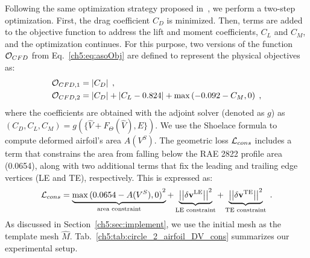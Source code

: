 Following the same optimization strategy proposed in~\citet{aa.Li2021}, we perform a two-step optimization. First, the drag coefficient $C_D$ is minimized. Then, terms are added to the objective function to address the lift and moment coefficients, $C_L$ and $C_M$, and the optimization continues. For this purpose, two versions of the function $ \mathcal{O}_{CFD}$ from Eq.~\ref{ch5:eq:asoObj} are defined to represent the physical objectives as:
%
\begin{align}
    &\mathcal{O}_{CFD,1} = \left| C_D \right|\;, \\
    &\mathcal{O}_{CFD,2} = \left| C_D \right| + \left| C_L-0.824 \right| + \max \left( -0.092 - C_M, 0 \right) \;, \nonumber 
\end{align}
%
where the coefficients are obtained with the adjoint solver (denoted as $g$) as $(C_D,C_L,C_M)=g\left(\{\hat{V}+F_\Theta(\hat{V}),E\}\right)$. 
We use the Shoelace formula to compute deformed airfoil's area $A(V^S)$. The geometric loss $\mathcal{L}_{cons}$ includes a term that constrains the area from falling below the RAE 2822 profile area (\num{0.0654}), along with two additional terms that fix the leading and trailing edge vertices (LE and TE), respectively. This is expressed as:
\begin{equation}
    \mathcal{L}_{cons} = 
    \underbrace{\max {(0.0654-A(V^S),0)}^2}_\text{area constraint} + 
    \underbrace{\left|\left| \delta\mathbf{v}^\text{LE} \right|\right|^2}_\text{LE constraint} + 
    \underbrace{\left|\left| \delta\mathbf{v}^\text{TE} \right|\right|^2}_\text{TE constraint}\;.
\end{equation}
%
As discussed in Section~\ref{ch5:sec:implement}, we use the initial mesh as the template mesh $\hat{M}$.  Tab.~\ref{ch5:tab:circle_2_airfoil_DV_cons} summarizes our experimental setup. 

